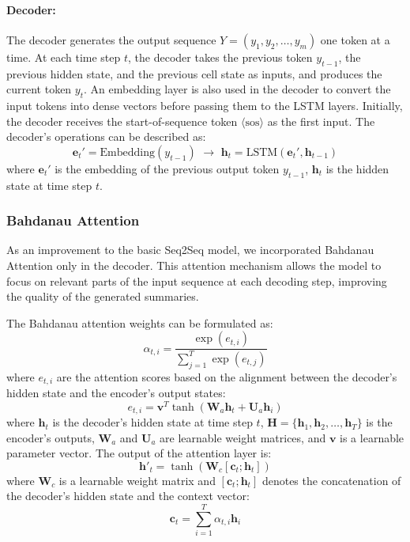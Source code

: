 \documentclass[a4papers, 11pt]{article}
\begin{document}
\paragraph{Decoder:}
The decoder generates the output sequence \( Y = (y_1, y_2, \ldots, y_m) \) one token at a time. At each time step \( t \), the decoder takes the previous token \( y_{t-1} \), the previous hidden state, and the previous cell state as inputs, and produces the current token \( y_t \). An embedding layer is also used in the decoder to convert the input tokens into dense vectors before passing them to the LSTM layers. Initially, the decoder receives the start-of-sequence token \( \langle \text{sos} \rangle \) as the first input. The decoder's operations can be described as:
\begin{equation}
    \mathbf{e}_t' = \text{Embedding}(y_{t-1}) \,\, \rightarrow \,\, \mathbf{h}_t = \text{LSTM}(\mathbf{e}_t', \mathbf{h}_{t-1})
\end{equation}
where \( \mathbf{e}_t' \) is the embedding of the previous output token \( y_{t-1} \), \( \mathbf{h}_t \) is the hidden state at time step \( t \).

\subsubsection{Bahdanau Attention}

As an improvement to the basic Seq2Seq model, we incorporated Bahdanau Attention \citep{bahdanau2014neural} only in the decoder. This attention mechanism allows the model to focus on relevant parts of the input sequence at each decoding step, improving the quality of the generated summaries.

The Bahdanau attention weights can be formulated as:
\begin{equation}
    \alpha_{t,i} = \frac{\exp(e_{t,i})}{\sum_{j=1}^{T} \exp(e_{t,j})}
\end{equation}
where \( e_{t,i}\) are the attention scores based on the alignment between the decoder's hidden state and the encoder's output states:
\begin{equation}
    e_{t,i} = \mathbf{v}^T \tanh(\mathbf{W}_a \mathbf{h}_t + \mathbf{U}_a \mathbf{h}_i)
\end{equation}
where \( \mathbf{h}_t \) is the decoder's hidden state at time step \( t \), \( \mathbf{H} = \{\mathbf{h}_1, \mathbf{h}_2, \ldots, \mathbf{h}_T\} \) is the encoder's outputs, \( \mathbf{W}_a \) and \( \mathbf{U}_a \) are learnable weight matrices, and \( \mathbf{v} \) is a learnable parameter vector.
The output of the attention layer is:
\begin{equation}
    \mathbf{h}'_t = \tanh(\mathbf{W}_c [\mathbf{c}_t ; \mathbf{h}_t])
\end{equation}
where \( \mathbf{W}_c \) is a learnable weight matrix and \( [\mathbf{c}_t ; \mathbf{h}_t] \) denotes the concatenation of the decoder's hidden state and the context vector:
\begin{equation}
    \mathbf{c}_t = \sum_{i=1}^{T} \alpha_{t,i} \mathbf{h}_i
\end{equation}
\end{document}
